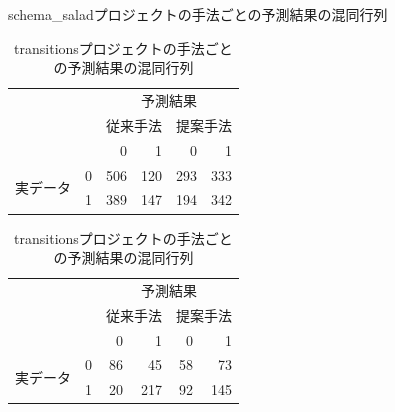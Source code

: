 \documentclass[submit,noauthor,ses,dvipdfmx]{ipsj}
\begin{document}
\begin{table}[tb]
    \label{tab:schema_salad}
    \centering
    \caption{schema\_saladプロジェクトの手法ごとの予測結果の混同行列}
    \vspace{2mm}
    \begin{tabular}{ll|r|r||r|r}
    \hline
        ~ & ~ & \multicolumn{4}{c}{予測結果} \\ \cline{3-6}
        ~ & ~ & \multicolumn{2}{c||}{従来手法} & \multicolumn{2}{c}{提案手法} \\ \cline{3-6}
        & ~ & 0 & 1 & 0 & 1 \\ \hline
        \multirow{2}{*}{実データ} & \multicolumn{1}{|c|}{0} & 506 & 120 & 293 & 333\\ \cline{2-6}
        & \multicolumn{1}{|c|}{1} & 389 & 147 & 194 & 342\\ \hline
    \end{tabular}

    \vspace{4mm}
    \centering
    \label{tab:transitions}
    \caption{transitionsプロジェクトの手法ごとの予測結果の混同行列}
    \vspace{2mm}
    \begin{tabular}{ll|r|r||r|r}
    \hline
        ~ & ~ & \multicolumn{4}{c}{予測結果} \\ \cline{3-6}
        ~ & ~ & \multicolumn{2}{c||}{従来手法} & \multicolumn{2}{c}{提案手法} \\ \cline{3-6}
        & ~ & 0 & 1 & 0 & 1 \\ \hline
        \multirow{2}{*}{実データ} & \multicolumn{1}{|c|}{0} & 86 & 45 & 58 & 73 \\ \cline{2-6}
        & \multicolumn{1}{|c|}{1} & 20 & 217 & 92 & 145 \\ \hline
    \end{tabular}
\end{table}





\end{document}
